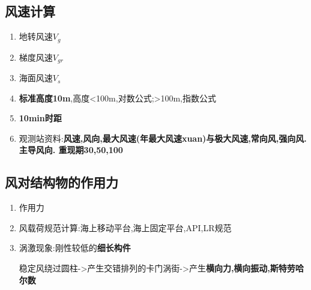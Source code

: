 	\subsection{风速计算}
		\begin{enumerate}
			\item 地转风速$V_g$
			\item 梯度风速$V_{gr}$
			\item 海面风速$V_s$
			\item \textbf{标准高度10m},高度<100m,对数公式;>100m,指数公式
			\item \textbf{10min时距}
			\item 观测站资料:\textbf{风速,风向,最大风速(年最大风速xuan)与极大风速,常向风,强向风. 主导风向. 重现期30,50,100}
		\end{enumerate}
	
	\subsection{风对结构物的作用力}
		\begin{enumerate}
			\item 作用力
			\item 风载荷规范计算:海上移动平台,海上固定平台,API,LR规范
			\item 涡激现象:刚性较低的\textbf{细长构件}
			
			稳定风绕过圆柱->产生交错排列的卡门涡街->产生\textbf{横向力,横向振动,斯特劳哈尔数} 
		\end{enumerate}